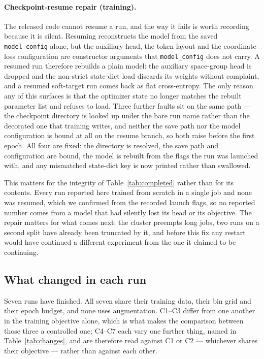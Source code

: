 \documentclass[manuscript,screen,review]{acmart}
\begin{document}
\paragraph{Checkpoint-resume repair (training).}
The released code cannot resume a run, and the way it fails is worth recording
because it is silent. Resuming reconstructs the model from the saved
\texttt{model\_config} alone, but the auxiliary head, the token layout and the
coordinate-loss configuration are constructor arguments that
\texttt{model\_config} does not carry. A resumed run therefore rebuilds a plain
model: the auxiliary space-group head is dropped and the non-strict state-dict
load discards its weights without complaint, and a resumed soft-target run comes
back as flat cross-entropy. The only reason any of this surfaces is that the
optimizer state no longer matches the rebuilt parameter list and refuses to
load. Three further faults sit on the same path --- the checkpoint directory is
looked up under the bare run name rather than the decorated one that training
writes, and neither the save path nor the model configuration is bound at all on
the resume branch, so both raise before the first epoch. All four are fixed: the
directory is resolved, the save path and configuration are bound, the model is
rebuilt from the flags the run was launched with, and any mismatched state-dict
key is now printed rather than swallowed.

This matters for the integrity of Table~\ref{tab:completed} rather than for its
contents. Every run reported here trained from scratch in a single job and none
was resumed, which we confirmed from the recorded launch flags, so no reported
number comes from a model that had silently lost its head or its objective. The
repair matters for what comes next: the cluster preempts long jobs, two runs on
a second split have already been truncated by it, and before this fix any
restart would have continued a different experiment from the one it claimed to
be continuing.

\subsection{What changed in each run}
\label{sec:changes}

Seven runs have finished. All seven share their training data, their bin grid
and their epoch budget, and none uses augmentation. C1--C3 differ from one
another in the training objective alone, which is what makes the comparison
between those three a controlled one; C4--C7 each vary one further thing, named
in Table~\ref{tab:changes}, and are therefore read against C1 or C2 --- whichever
shares their objective --- rather than against each other.
\end{document}

